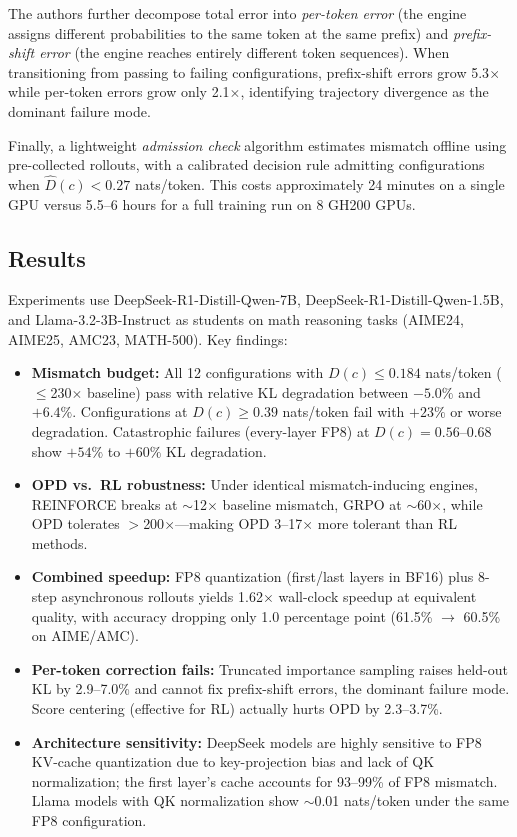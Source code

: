 \documentclass[11pt,a4paper]{article}
\begin{document}
The authors further decompose total error into \emph{per-token error} (the engine assigns different probabilities to the same token at the same prefix) and \emph{prefix-shift error} (the engine reaches entirely different token sequences). When transitioning from passing to failing configurations, prefix-shift errors grow 5.3$\times$ while per-token errors grow only 2.1$\times$, identifying trajectory divergence as the dominant failure mode.

Finally, a lightweight \emph{admission check} algorithm estimates mismatch offline using pre-collected rollouts, with a calibrated decision rule admitting configurations when $\hat{D}(c) < 0.27$ nats/token. This costs approximately 24 minutes on a single GPU versus 5.5--6 hours for a full training run on 8 GH200 GPUs.

\subsection{Results}
Experiments use DeepSeek-R1-Distill-Qwen-7B, DeepSeek-R1-Distill-Qwen-1.5B, and Llama-3.2-3B-Instruct as students on math reasoning tasks (AIME24, AIME25, AMC23, MATH-500). Key findings:

\begin{itemize}
  \item \textbf{Mismatch budget:} All 12 configurations with $D(c) \leq 0.184$ nats/token ($\leq$230$\times$ baseline) pass with relative KL degradation between $-5.0\%$ and $+6.4\%$. Configurations at $D(c) \geq 0.39$ nats/token fail with $+23\%$ or worse degradation. Catastrophic failures (every-layer FP8) at $D(c) = 0.56$--$0.68$ show $+54\%$ to $+60\%$ KL degradation.
  \item \textbf{OPD vs.\ RL robustness:} Under identical mismatch-inducing engines, REINFORCE breaks at $\sim$12$\times$ baseline mismatch, GRPO at $\sim$60$\times$, while OPD tolerates $>$200$\times$---making OPD 3--17$\times$ more tolerant than RL methods.
  \item \textbf{Combined speedup:} FP8 quantization (first/last layers in BF16) plus 8-step asynchronous rollouts yields 1.62$\times$ wall-clock speedup at equivalent quality, with accuracy dropping only 1.0 percentage point (61.5\% $\to$ 60.5\% on AIME/AMC).
  \item \textbf{Per-token correction fails:} Truncated importance sampling raises held-out KL by 2.9--7.0\% and cannot fix prefix-shift errors, the dominant failure mode. Score centering (effective for RL) actually hurts OPD by 2.3--3.7\%.
  \item \textbf{Architecture sensitivity:} DeepSeek models are highly sensitive to FP8 KV-cache quantization due to key-projection bias and lack of QK normalization; the first layer's cache accounts for 93--99\% of FP8 mismatch. Llama models with QK normalization show $\sim$0.01 nats/token under the same FP8 configuration.
\end{itemize}
\end{document}
